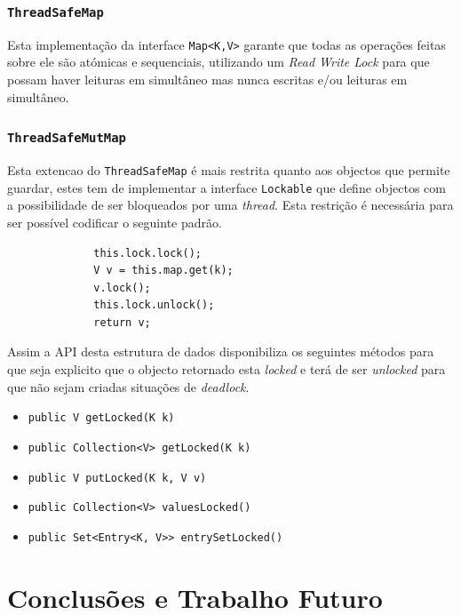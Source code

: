 \documentclass[a4paper]{article}
\begin{document}
\subsubsection{\texttt{ThreadSafeMap}}

Esta implementação da interface \texttt{Map<K,V>} garante que todas as operações feitas sobre ele são atómicas e sequenciais, utilizando um \textit{Read Write Lock} para que possam haver leituras em simultâneo mas nunca escritas e/ou leituras em simultâneo.

\subsubsection{\texttt{ThreadSafeMutMap}}

Esta extencao do \texttt{ThreadSafeMap} é mais restrita quanto aos objectos que permite guardar, estes tem de implementar a interface \texttt{Lockable} que define objectos com a possibilidade de ser bloqueados por uma \textit{thread}. Esta restrição é necessária para ser possível codificar o seguinte padrão.

\begin{figure}[H]
    \begin{verbatim}
        this.lock.lock();
        V v = this.map.get(k);
        v.lock();
        this.lock.unlock();
        return v;
    \end{verbatim}
\end{figure}

Assim a API desta estrutura de dados disponibiliza os seguintes métodos para que seja explicito que o objecto retornado esta \textit{locked} e terá de ser \textit{unlocked} para que não sejam criadas situações de \textit{deadlock}.

\begin{itemize}
    \item \texttt{public V getLocked(K k)}
    \item \texttt{public Collection<V> getLocked(K k)}
    \item \texttt{public V putLocked(K k, V v)}
    \item \texttt{public Collection<V> valuesLocked()}
    \item \texttt{public Set<Entry<K, V>> entrySetLocked()}
\end{itemize}

\pagebreak
\section{Conclusões e Trabalho Futuro}
\end{document}
